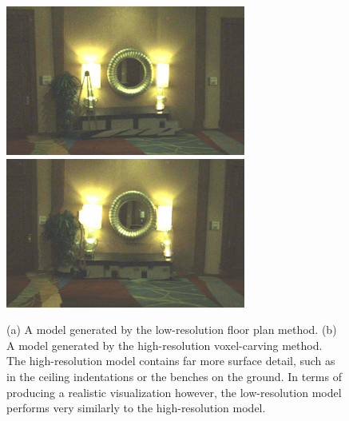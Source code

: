 \documentclass[]{spie}  %
\begin{document}
\begin{figure}
  \includegraphics[width=3.1in]{results_houston_2_2d.png}
  \includegraphics[width=3.1in]{results_houston_2_3d.png}\\
   
  \caption{(a) A model generated by the low-resolution floor plan
    method. (b) A model generated by the high-resolution voxel-carving
    method. The high-resolution model contains far more surface
    detail, such as in the ceiling indentations or the benches on the
    ground. In terms of producing a realistic visualization however,
    the low-resolution model performs very similarly to the
    high-resolution model.}
  \label{fig:2dvs3d}
\end{figure}
\end{document}
